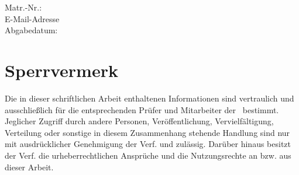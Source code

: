 \documentclass[a4paper, 11pt, german ]{article}
\def\True{1}
\begin{document}
\begin{titlepage}
\begin{center}
	\vspace{10ex}
	\textbf{\thetitle}

\end{center}

\vspace{10ex}
\theauthor\\
\Addresse\\
Matr.-Nr.: \MatrNummer\\
\vspace{1ex}
E-Mail-Adresse \Email\\
\vspace{3ex}
Abgabedatum: \thedate

\fi
\restoregeometry
\end{titlepage}

\newpage
{}
\tableofcontents




\if\Sperrvermerk \True
\newpage
 \section*{Sperrvermerk}
 Die in dieser schriftlichen Arbeit enthaltenen Informationen sind vertraulich und ausschließlich
 für die entsprechenden Prüfer und Mitarbeiter der \Hochschulname~bestimmt.
Jeglicher Zugriff durch andere Personen, Veröffentlichung, Vervielfältigung,
Verteilung oder sonstige in diesem Zusammenhang stehende Handlung sind nur mit ausdrücklicher
Genehmigung der Verf. und \Firma\space zulässig. Darüber hinaus besitzt der
Verf. die urheberrecht\-lichen Ansprüche und \Firma\space die Nutzungsrechte
an bzw. aus dieser Arbeit.
\newpage
\fi




\if\Makefile\True
  
  
  
\else
  
  
  

\fi

\printbibliography


\newpage
\end{document}
